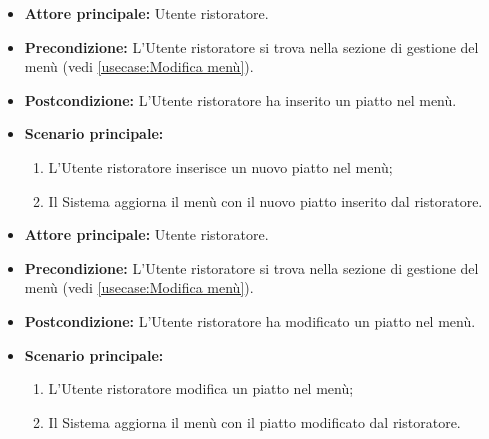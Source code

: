 \label{usecase:Inserimento piatto}
\begin{itemize}

	\item \textbf{Attore principale:} Utente ristoratore.

	\item \textbf{Precondizione:} L'Utente ristoratore si trova nella sezione di gestione del menù (vedi \autoref{usecase:Modifica menù}).

	\item \textbf{Postcondizione:} L'Utente ristoratore ha inserito un piatto nel menù.

	\item \textbf{Scenario principale:}
	\begin{enumerate}
		\item L'Utente ristoratore inserisce un nuovo piatto nel menù;
		\item Il Sistema aggiorna il menù con il nuovo piatto inserito dal ristoratore.
	\end{enumerate}

\end{itemize}


\label{usecase:Modifica piatto}
\begin{itemize}

	\item \textbf{Attore principale:} Utente ristoratore.

	\item \textbf{Precondizione:} L'Utente ristoratore si trova nella sezione di gestione del menù (vedi \autoref{usecase:Modifica menù}).

	\item \textbf{Postcondizione:} L'Utente ristoratore ha modificato un piatto nel menù.

	\item \textbf{Scenario principale:}
	\begin{enumerate}
		\item L'Utente ristoratore modifica un piatto nel menù;
		\item Il Sistema aggiorna il menù con il piatto modificato dal ristoratore.
	\end{enumerate}

\end{itemize}


